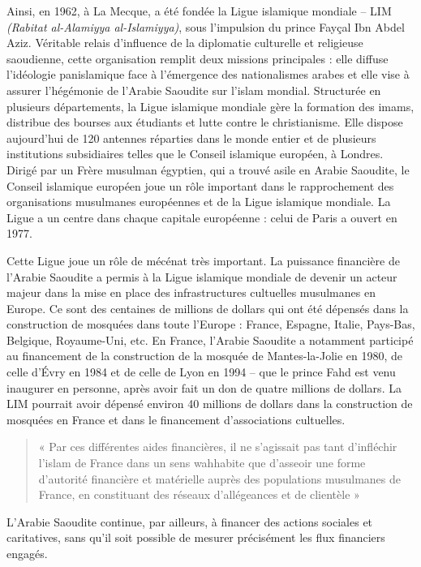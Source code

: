 Ainsi, en 1962, à La Mecque, a été fondée la Ligue islamique mondiale --
LIM \emph{(Rabitat al-Alamiyya al-Islamiyya)}, sous l'impulsion du
prince Fayçal Ibn Abdel Aziz. Véritable relais d'influence de la
diplomatie culturelle et religieuse saoudienne, cette organisation
remplit deux missions principales : elle diffuse l'idéologie
panislamique face à l'émergence des nationalismes arabes et elle vise à
assurer l'hégémonie de l'Arabie Saoudite sur l'islam mondial. Structurée
en plusieurs départements, la Ligue islamique mondiale gère la formation
des imams, distribue des bourses aux étudiants et lutte contre le
christianisme. Elle dispose aujourd'hui de 120 antennes réparties dans
le monde entier et de plusieurs institutions subsidiaires telles que le
Conseil islamique européen, à Londres. Dirigé par un Frère musulman
égyptien, qui a trouvé asile en Arabie Saoudite, le Conseil islamique
européen joue un rôle important dans le rapprochement des organisations
musulmanes européennes et de la Ligue islamique mondiale. La Ligue a un
centre dans chaque capitale européenne : celui de Paris a ouvert en
1977.

Cette Ligue joue un rôle de mécénat très important. La puissance
financière de l'Arabie Saoudite a permis à la Ligue islamique mondiale
de devenir un acteur majeur dans la mise en place des infrastructures
cultuelles musulmanes en Europe. Ce sont des centaines de millions de
dollars qui ont été dépensés dans la construction de mosquées dans toute
l'Europe : France, Espagne, Italie, Pays-Bas, Belgique, Royaume-Uni,
etc. En France, l'Arabie Saoudite a notamment participé au financement
de la construction de la mosquée de Mantes-la-Jolie en 1980, de celle
d'Évry en 1984 et de celle de Lyon en 1994 -- que le prince Fahd est
venu inaugurer en personne, après avoir fait un don de quatre millions
de dollars. La LIM pourrait avoir dépensé environ 40 millions de dollars
dans la construction de mosquées en France et dans le financement
d'associations cultuelles. 
\begin{quote}
« Par ces différentes aides
financières, il ne s'agissait pas tant d'infléchir l'islam de France
dans un sens wahhabite que d'asseoir une forme d'autorité financière et
matérielle auprès des populations musulmanes de France, en constituant
des réseaux d'allégeances et de clientèle »
\end{quote} 
L'Arabie Saoudite
continue, par ailleurs, à financer des actions sociales et caritatives,
sans qu'il soit possible de mesurer précisément les flux financiers
engagés.

